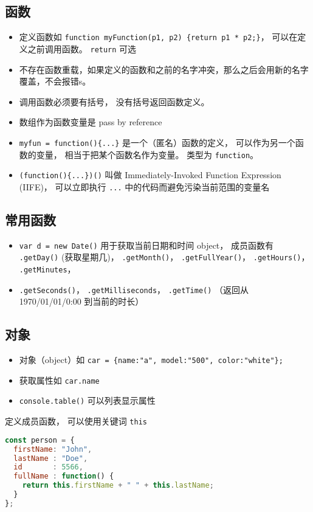 \subsection{函数}
\begin{itemize}
\item 定义函数如 \verb|function myFunction(p1, p2) {return p1 * p2;}|， 可以在定义之前调用函数。 \verb|return| 可选
\item 不存在函数重载，如果定义的函数和之前的名字冲突，那么之后会用新的名字覆盖，不会报错s。
\item 调用函数必须要有括号， 没有括号返回函数定义。
\item 数组作为函数变量是 pass by reference
\item \verb|myfun = function(){...}| 是一个（匿名）函数的定义， 可以作为另一个函数的变量， 相当于把某个函数名作为变量。 类型为 \verb|function|。
\item \verb|(function(){...})()| 叫做 Immediately-Invoked Function Expression (IIFE)， 可以立即执行 \verb|...| 中的代码而避免污染当前范围的变量名
\end{itemize}

\subsection{常用函数}
\begin{itemize}
\item \verb|var d = new Date()| 用于获取当前日期和时间 object， 成员函数有 \verb|.getDay()| (获取星期几)， \verb|.getMonth()|， \verb|.getFullYear()|， \verb|.getHours()|， \verb|.getMinutes|，
\item \verb|.getSeconds()|， \verb|.getMilliseconds|， \verb|.getTime()| （返回从 1970/01/01/0:00 到当前的时长）
\end{itemize}

\subsection{对象}
\begin{itemize}
\item 对象（object）如 \verb|car = {name:"a", model:"500", color:"white"};|
\item 获取属性如 \verb|car.name|
\item \verb|console.table()| 可以列表显示属性
\end{itemize}

定义成员函数， 可以使用关键词 \verb|this|
\begin{lstlisting}[language=js]
const person = {
  firstName: "John",
  lastName : "Doe",
  id       : 5566,
  fullName : function() {
    return this.firstName + " " + this.lastName;
  }
};
\end{lstlisting}

